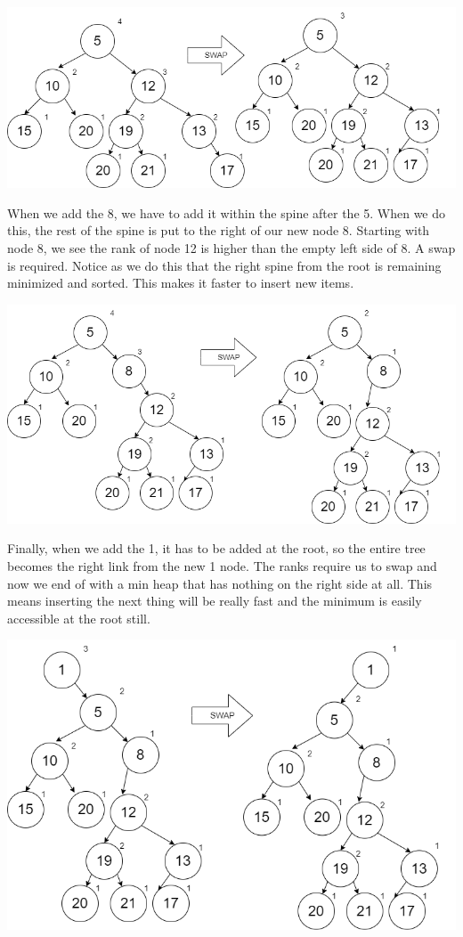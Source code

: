 \documentclass[
]{book}
\begin{document}
\includegraphics{images/heap11.drawio.png}

When we add the 8, we have to add it within the spine after the 5. When we do this, the rest of the spine is put to the right of our new node 8. Starting with node 8, we see the rank of node 12 is higher than the empty left side of 8. A swap is required. Notice as we do this that the right spine from the root is remaining minimized and sorted. This makes it faster to insert new items.

\includegraphics{images/heap12.drawio.png}

Finally, when we add the 1, it has to be added at the root, so the entire tree becomes the right link from the new 1 node. The ranks require us to swap and now we end of with a min heap that has nothing on the right side at all. This means inserting the next thing will be really fast and the minimum is easily accessible at the root still.

\includegraphics{images/heap13.drawio.png}
\end{document}
